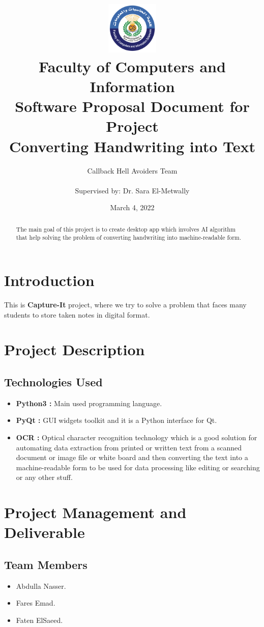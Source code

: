\documentclass[12pt]{article}
\title{
{\includegraphics[width=3cm, height=2.5cm]{images/logo.png}}\\
{\large Faculty of Computers and Information}\\
{\textbf{Software Proposal Document for Project \\ Converting Handwriting into Text}}
}
\author{Callback Hell Avoiders Team \\ \\
Supervised by: Dr. Sara El-Metwally}
\date{March 4, 2022}
\begin{document}
\maketitle

\begin{abstract}
The main goal of this project is to create desktop app which involves AI algorithm that help solving the problem of converting handwriting into machine-readable form.

\end{abstract}

\section{Introduction}
This is \textbf{Capture-It} project, where we try to solve a problem that faces many students to store taken notes in digital format.


\section{Project Description}
\subsection{Technologies Used}
\begin{itemize}
    \item \textbf{Python3 : } Main used programming language.
    \item \textbf{PyQt : } GUI widgets toolkit and it is a Python interface for Qt.
    \item \textbf{OCR : } Optical character recognition technology which is a good solution for automating data extraction from printed or written text from a scanned document or image file or white board and then converting the text into a machine-readable form to be used for data processing like editing or searching or any other stuff.
\end{itemize}

\newpage
\section{Project Management and Deliverable}
\subsection{Team Members}
\begin{itemize}
    \item Abdulla Nasser.
    \item Fares Emad.
    \item Faten ElSaeed.
\end{itemize}
\end{document}
